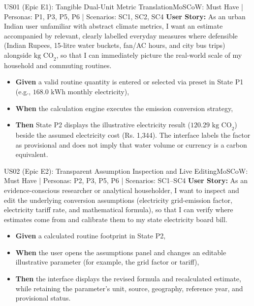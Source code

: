\documentclass[12pt,a4paper]{article}
\begin{document}
\begin{storybox}{US01 (Epic E1): Tangible Dual-Unit Metric Translation}{MoSCoW: Must Have | Personas: P1, P3, P5, P6 | Scenarios: SC1, SC2, SC4}
\textbf{User Story:} As an urban Indian user unfamiliar with abstract climate metrics, I want an estimate accompanied by relevant, clearly labelled everyday measures where defensible (Indian Rupees, 15-litre water buckets, fan/AC hours, and city bus trips) alongside $\text{kg CO}_2$, so that I can immediately picture the real-world scale of my household and commuting routines.
\begin{itemize}
    \item \textbf{Given} a valid routine quantity is entered or selected via preset in State P1 (e.g., $168.0\text{ kWh}$ monthly electricity),
    \item \textbf{When} the calculation engine executes the emission conversion strategy,
    \item \textbf{Then} State P2 displays the illustrative electricity result ($120.29\text{ kg CO}_2$) beside the assumed electricity cost (Rs. 1,344). The interface labels the factor as provisional and does not imply that water volume or currency is a carbon equivalent.
\end{itemize}
\end{storybox}

\begin{storybox}{US02 (Epic E2): Transparent Assumption Inspection and Live Editing}{MoSCoW: Must Have | Personas: P2, P3, P5, P6 | Scenarios: SC1--SC4}
\textbf{User Story:} As an evidence-conscious researcher or analytical householder, I want to inspect and edit the underlying conversion assumptions (electricity grid-emission factor, electricity tariff rate, and mathematical formula), so that I can verify where estimates come from and calibrate them to my state electricity board bill.
\begin{itemize}
    \item \textbf{Given} a calculated routine footprint in State P2,
    \item \textbf{When} the user opens the assumptions panel and changes an editable illustrative parameter (for example, the grid factor or tariff),
    \item \textbf{Then} the interface displays the revised formula and recalculated estimate, while retaining the parameter's unit, source, geography, reference year, and provisional status.
\end{itemize}
\end{storybox}
\end{document}

